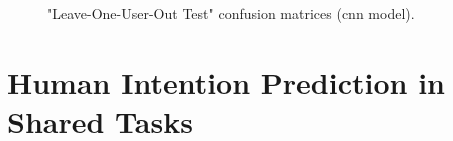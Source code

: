 \begin{figure}[ht]
   \centering
   \begin{subfigure}[b]{0.32\columnwidth}
       {\fontsize{8}{10}\selectfont}
       \caption{\centering}
   \end{subfigure} \
   \begin{subfigure}[b]{0.32\columnwidth}
       {\fontsize{8}{10}\selectfont}
       \caption{\centering}
   \end{subfigure} \
   \begin{subfigure}[b]{0.32\columnwidth}
       {\fontsize{8}{10}\selectfont}
       \caption{\centering}
   \end{subfigure}
   \caption{"Leave-One-User-Out Test" confusion matrices (\acs{cnn} model).}
   \label{fig:conf_matrix_examplesC_v2}
\end{figure}


\section{Human Intention Prediction in Shared Tasks}
\label{section:human_intention_prediction}

